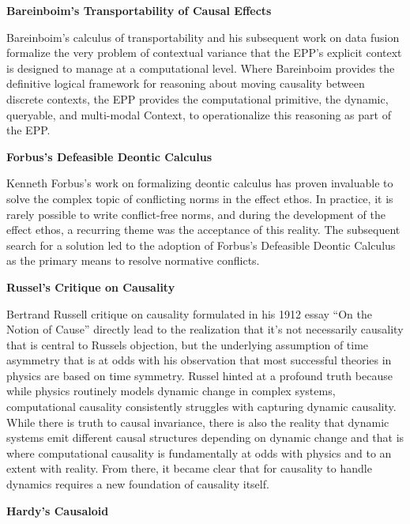\textbf{Bareinboim's Transportability of Causal Effects}

Bareinboim's calculus of transportability \cite{bareinboim2012transportability} and his subsequent work on data fusion formalize the very problem of contextual variance that the EPP's explicit context is designed to manage at a computational level. Where Bareinboim provides the definitive logical framework for reasoning about moving causality between discrete contexts, the EPP provides the computational primitive, the dynamic, queryable, and multi-modal Context, to operationalize this reasoning as part of the EPP.

\textbf{Forbus's Defeasible Deontic Calculus}

Kenneth Forbus's work on formalizing deontic calculus \cite{olson2024DDIC} has proven invaluable to solve the complex topic of conflicting norms in the effect ethos. In practice, it is rarely possible to write conflict-free norms, and during the development of the effect ethos, a recurring theme was the acceptance of this reality. The subsequent search for a solution led to the adoption of Forbus's Defeasible Deontic Calculus as the primary means to resolve normative conflicts.

\textbf{Russel's Critique on Causality}

Bertrand Russell critique on causality  formulated in his 1912 essay ``On the Notion of Cause''\cite{RussellOnCause} directly lead to the realization that it's not necessarily causality that is central to Russels objection, but the underlying assumption of time asymmetry that is at odds with his observation that most successful theories in physics are based on time symmetry. Russel hinted at a profound truth because while physics routinely models dynamic change in complex systems, computational causality consistently struggles with capturing dynamic causality.  While there is truth to causal invariance, there is also the reality that dynamic systems emit different causal structures depending on dynamic change and that is where computational causality is fundamentally at odds with physics and to an extent with reality. From there, it became clear that for causality to handle dynamics requires a new foundation of causality itself.

\textbf{Hardy's Causaloid}

